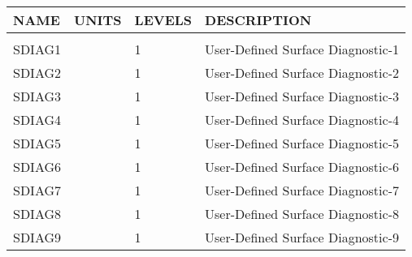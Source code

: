 \newpage
\vspace*{\fill}
\begin{table}
\begin{tabular}{llll}
\hline\hline
 NAME & UNITS & LEVELS & DESCRIPTION \\
\hline

&\\
 SDIAG1   &             &    1  
         &\begin{minipage}[t]{3in}
          {User-Defined Surface Diagnostic-1} 
         \end{minipage}\\
 SDIAG2   &             &    1  
         &\begin{minipage}[t]{3in}
          {User-Defined Surface Diagnostic-2} 
         \end{minipage}\\
 SDIAG3   &             &    1  
         &\begin{minipage}[t]{3in}
          {User-Defined Surface Diagnostic-3} 
         \end{minipage}\\
 SDIAG4   &             &    1  
         &\begin{minipage}[t]{3in}
          {User-Defined Surface Diagnostic-4} 
         \end{minipage}\\
 SDIAG5   &             &    1  
         &\begin{minipage}[t]{3in}
          {User-Defined Surface Diagnostic-5} 
         \end{minipage}\\
 SDIAG6   &             &    1  
         &\begin{minipage}[t]{3in}
          {User-Defined Surface Diagnostic-6} 
         \end{minipage}\\
 SDIAG7   &             &    1  
         &\begin{minipage}[t]{3in}
          {User-Defined Surface Diagnostic-7} 
         \end{minipage}\\
 SDIAG8   &             &    1  
         &\begin{minipage}[t]{3in}
          {User-Defined Surface Diagnostic-8} 
         \end{minipage}\\
 SDIAG9   &             &    1  
         &\begin{minipage}[t]{3in}
          {User-Defined Surface Diagnostic-9} 

\end{minipage}
\end{tabular}
\end{table}
